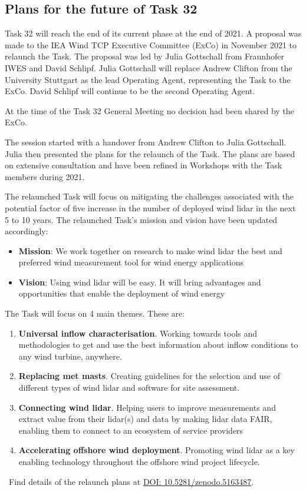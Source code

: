 \subsection{Plans for the future of Task 32}
Task 32 will reach the end of its current phase at the end of 2021. A proposal was made to the IEA Wind TCP Executive Committee (ExCo) in November 2021 to relaunch the Task. The proposal was led by Julia Gottschall from Fraunhofer IWES and David Schlipf. Julia Gottschall will replace Andrew Clifton from the University Stuttgart as the lead Operating Agent, representing the Task to the ExCo. David Schlipf will continue to be the second Operating Agent.

At the time of the Task 32 General Meeting no decision had been shared by the ExCo.

The session started with a handover from Andrew Clifton to Julia Gottschall. Julia then presented the plans for the relaunch of the Task. The plans are based on extensive consultation and have been refined in Workshops with the Task members during 2021.

The relaunched Task will focus on mitigating the challenges associated with the potential factor of five increase in the number of deployed wind lidar in the next 5 to 10 years. The relaunched Task's mission and vision have been updated accordingly:
\begin{itemize}
    \item \textbf{Mission}: We work together on research to make wind lidar the best and preferred wind measurement tool for wind energy applications
    \item \textbf{Vision}: Using wind lidar will be easy. It will bring advantages and opportunities that enable the deployment of wind energy
\end{itemize}

The Task will focus on 4 main themes. These are:
\begin{enumerate}
    \item \textbf{Universal inflow characterisation}. Working towards tools and methodologies to get and use the best information about inflow conditions to any wind turbine, anywhere.
    \item \textbf{Replacing met masts}. Creating guidelines for the selection and use of different types of wind lidar and software for site assessment.
    \item \textbf{Connecting wind lidar}. Helping users to improve measurements and extract value from their lidar(s) and data by making lidar data FAIR, enabling them to connect to an ecosystem of service providers
    \item \textbf{Accelerating offshore wind deployment}. Promoting wind lidar as a key enabling technology throughout the offshore wind project lifecycle.
\end{enumerate}

\faFilePowerpointO ~Find details of the relaunch plans at \href{https://doi.org/10.5281/zenodo.5163487
}{DOI: 10.5281/zenodo.5163487}.